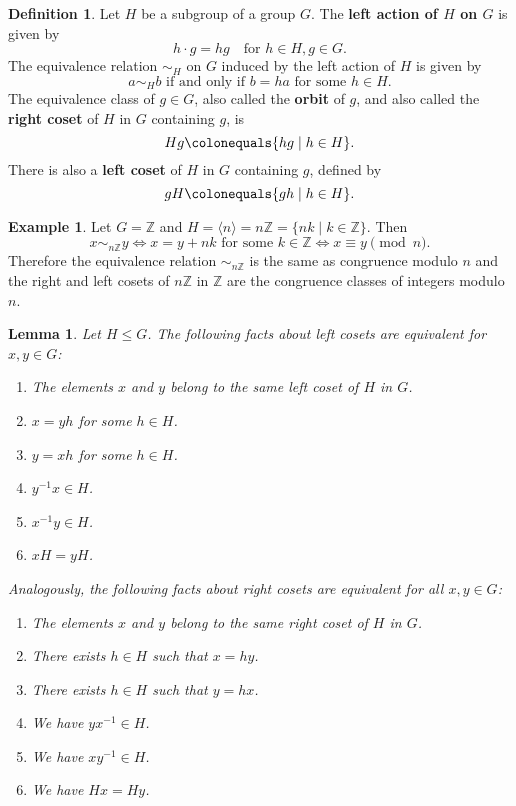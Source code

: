 \documentclass[12pt]{report}
\newtheorem{lemma}[theorem]{Lemma}
\numberwithin{equation}{section}
\numberwithin{theorem}{chapter}
\theoremstyle{definition}
\newtheorem{definition}[theorem]{Definition}
\newtheorem{example}[theorem]{Example}
\newtheorem*{basic properties}{Basic Properties}
\newtheorem*{Important Remark}{Important Remark}
\begin{document}
\begin{definition}
 Let $H$ be a subgroup of a group $G$. The {\bf left action of $H$ on $G$} is given by 
 $$h\cdot g=hg \quad \textrm{for } h\in H, g\in G.$$ 
 The equivalence relation $\sim_H$ on $G$ induced by the left action of $H$ is given by 
 $$a \sim_H b \textrm{ if and only if } b = ha \text{ for some } h \in H.$$ 
 The equivalence class of $g \in G$, also called the {\bf orbit} of $g$, and also called the {\bf right coset} of $H$ in $G$ containing $g$, is
 $$Hg \colonequals \{hg \mid h \in H\}.$$ 
 There is also a {\bf left coset} of $H$ in $G$ containing $g$, defined by
 $$gH \colonequals \{gh \mid h \in H\}.$$ 
\end{definition}


\begin{example}
Let $G=\mathbb{Z}$ and $H=\langle n\rangle=n\mathbb{Z}=\{nk \mid k\in \mathbb{Z}\}$. Then 
$$x\sim_{ n\mathbb{Z}} y \iff x=y+nk \textrm{ for some } k\in \mathbb{Z} \iff x\equiv y \!\!\!\!\pmod n.$$ 
Therefore the equivalence relation $\sim_{ n\mathbb{Z}}$ is the same as congruence modulo $n$ and the right and left cosets of $n\mathbb{Z}$ in $\mathbb{Z}$ are the congruence classes of integers modulo $n$. 
\end{example}




\begin{lemma}\label{cosets}
Let $H \leq G$. The following facts about left cosets are equivalent for $x,y \in G$:

\vspace{-0.5em}
\begin{enumerate}[label=\arabic*.,leftmargin=15pt,itemsep=-0.1em]
\item The elements $x$ and $y$ belong to the same left coset of $H$ in $G$.
\item $x = yh$ for some $h \in H$.
\item $y = xh$ for some $h \in H$.
\item $y^{-1}x \in H$.
\item $x^{-1}y \in H$.
\item $xH = yH$.
\end{enumerate}

\vspace{-0.5em}

Analogously, the following facts about right cosets are equivalent for all $x,y \in G$:
\begin{enumerate}[label=\arabic*.,leftmargin=15pt,itemsep=-0.1em]
\item The elements $x$ and $y$ belong to the same right coset of $H$ in $G$.
\item There exists $h \in H$ such that $x = hy$.
\item There exists $h \in H$ such that $y = hx$.
\item We have $yx^{-1} \in H$.
\item We have $xy^{-1} \in H$.
\item We have $Hx = Hy$.
\end{enumerate}
\end{lemma}
\end{document}
